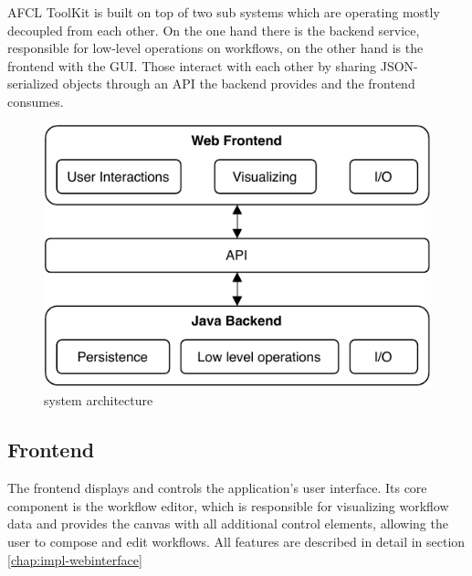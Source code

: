 \documentclass[a4paper,12pt,pdftex,halfparskip,cleardoubleempty,bibtotoc,liststotoc]{scrbook}
\begin{document}

AFCL ToolKit is built on top of two sub systems which are operating mostly decoupled from each other. On the one hand there is the backend service, responsible for low-level operations on workflows, on the other hand is the frontend with the GUI. Those interact with each other by sharing JSON-serialized objects through an API the backend provides and the frontend consumes.

\begin{figure}[H]
  \centering
  \vspace{0.8cm}
  \includegraphics[scale=0.8]{architecture}
  \caption{system architecture}
\end{figure}

\subsection{Frontend}

The frontend displays and controls the application's user interface. Its core component is the workflow editor, which is responsible for visualizing workflow data and provides the canvas with all additional control elements, allowing the user to compose and edit workflows. All features are described in detail in section  \ref{chap:impl-webinterface}


\end{document}
